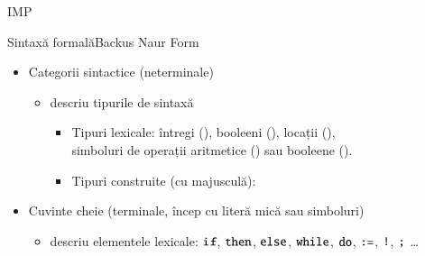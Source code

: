 \documentclass[handout,xcolor=pdftex,romanian,colorlinks]{beamer}
\begin{document}
\begin{section}{IMP}
\begin{frame}{Sintaxă formală}{Backus Naur Form}
\begin{itemize}
\alert{\renewcommand{\syntaxKeyword}{}\syntax[\Stmt]{\color{black}\Sif\;\BExp\Sthen\Block\Selse\Block}{}
	\syntaxCont[\Stmt]{\color{black}\Id \terminal{:=}\AExp\terminal{;}}{}}
   \item Categorii sintactice (neterminale) 
   \begin{itemize}
    \item descriu tipurile de sintaxă
     \begin{itemize}
      \item Tipuri lexicale: 
		întregi (), booleeni (), locații (),\\
		simboluri de operații aritmetice () sau booleene ().
	  \item Tipuri construite (cu majusculă):
     \end{itemize}
   \end{itemize}
   \item Cuvinte cheie (terminale, încep cu literă mică sau simboluri)
   \begin{itemize}
    \item descriu elementele lexicale: 
   $\mathrel{\text{\ttfamily if}}$, $\mathrel{\text{\ttfamily then}}$, $\mathrel{\text{\ttfamily else}}$,  
   $\mathrel{\text{\ttfamily while}}$, $\mathrel{\text{\ttfamily do}}$,
   $\mathrel{\text{\ttfamily :=}}$, $\mathrel{\text{\ttfamily !}}$, $\mathrel{\text{\ttfamily ;}}$ \ldots
   \end{itemize}
  \end{itemize}
 \end{frame}


\end{section}
\end{document}
